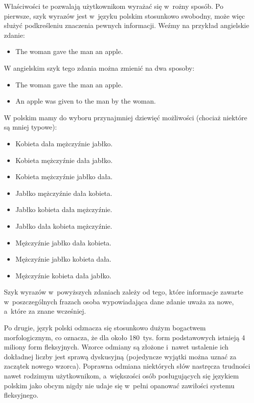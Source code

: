 \begin{multicols}{2}

Właściwości te pozwalają użytkownikom wyrażać się w~rożny
sposób. Po pierwsze, szyk wyrazów jest w~języku polskim stosunkowo
swobodny, może więc służyć podkreśleniu znaczenia pewnych
informacji. Weźmy na przykład angielskie zdanie: 

\begin{itemize} \item The woman gave the man an apple. \end{itemize} 

W angielskim szyk tego zdania można zmienić na dwa sposoby:
\begin{itemize} \item The woman gave the man an apple. \item An apple
was given to the man by the woman. \end{itemize} 

W polskim mamy do wyboru przynajmniej dziewięć możliwości
(chociaż niektóre są mniej typowe): \begin{itemize} \item Kobieta
dała mężczyźnie jabłko. \item Kobieta mężczyźnie dała
jabłko. \item Kobieta mężczyźnie jabłko dała. \item Jabłko
mężczyźnie dała kobieta. \item Jabłko kobieta dała
mężczyźnie. \item Jabłko dała kobieta mężczyźnie. \item
Mężczyźnie jabłko dała kobieta. \item Mężczyźnie jabłko
kobieta dała. \item Mężczyźnie kobieta dała jabłko. 

\end{itemize} 

Szyk wyrazów w~powyższych zdaniach zależy od tego, które
informacje zawarte w~poszczególnych frazach osoba wypowiadająca dane
zdanie uważa za nowe, a~które za znane wcześniej. 


Po drugie, język polski odznacza się stosunkowo dużym bogactwem
morfologicznym, co oznacza, że dla około 180~tys. form podstawowych
istnieją 4 miliony form fleksyjnych. Wzorce odmiany są złożone
i~nawet ustalenie ich dokładnej liczby jest sprawą dyskusyjną
(pojedyncze wyjątki można uznać za zaczątek nowego wzorca).
Poprawna odmiana niektórych słów nastręcza trudności nawet
rodzimym użytkownikom, a~większości osób posługujących się
językiem polskim jako obcym nigdy nie udaje się w~pełni opanować
zawiłości systemu fleksyjnego. 


\end{multicols}
